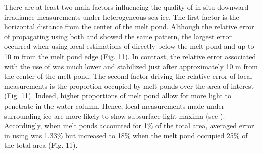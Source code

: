 There are at least two main factors influencing the quality of in situ downward irradiance measurements under heterogeneous sea ice. The first factor is the horizontal distance from the center of the melt pond. Although the relative error of propagating \edzero{} using both \ked{} and \klu{} showed the same pattern, the largest error occurred when using local estimations of \ked{} directly below the melt pond and up to 10 m from the melt pond edge (Fig. 11). In contrast, the relative error associated with the use of \klu{} was much lower and stabilized just after approximately 10 m from the center of the melt pond. The second factor driving the relative error of local measurements is the proportion occupied by melt ponds over the area of interest (Fig. 11). Indeed, higher proportions of melt pond allow for more light to penetrate in the water column. Hence, local measurements made under surrounding ice are more likely to show subsurface light maxima (see \citet{Frey2011}). Accordingly, when melt ponds accounted for 1\% of the total area, averaged error in \edz{} using \klu{} was 1.33\% but increased to 18\% when the melt pond occupied 25\% of the total area (Fig. 11).